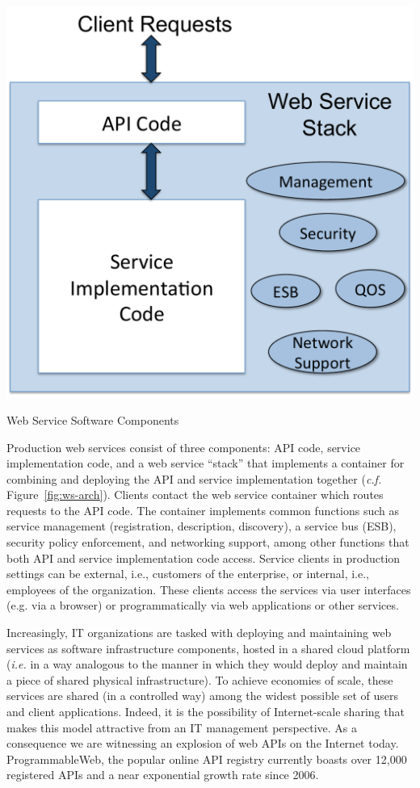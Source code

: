 \documentclass[10pt]{article}
\begin{document}
\begin{floatingfigure}[rb]{2.8in}
\vspace{-0.1in}
\includegraphics[scale=.34]{stack}
\vspace{-0.08in}
\caption{Web Service Software Components\label{fig:ws-arch}}
\end{floatingfigure}
Production web services consist of three components: API code, service
implementation code, and a web service ``stack'' that implements a container
for combining and deploying the API and service implementation
together ({\em c.f.} Figure~\ref{fig:ws-arch}).
Clients contact the web service container which routes requests to the
API code.  The container implements common functions such as 
service management (registration, description, discovery), a service
bus (ESB), security policy enforcement, and networking support, among other 
functions that both API and service implementation code access.
Service clients in production settings can be 
external, i.e., customers of the enterprise, or internal, i.e., employees of 
the organization.  These clients access the services via user 
interfaces (e.g. via a browser) or programmatically via web applications 
or other services. 

Increasingly, IT organizations are tasked with deploying and 
maintaining web services as software infrastructure components, hosted in a
shared cloud platform ({\em i.e.} in a way analogous to the manner in which they
would deploy and maintain a piece of shared physical infrastructure).  
To achieve economies of scale, these services are shared (in a controlled
way) among the widest possible set of users and client applications.  Indeed,
it is the possibility of Internet-scale sharing that makes this model
attractive from an IT management perspective. As a consequence we 
are witnessing an explosion of web APIs on the Internet today. ProgrammableWeb,
the popular online API registry currently boasts over 12,000 registered APIs and
a near exponential growth rate since 2006.
\end{document}
